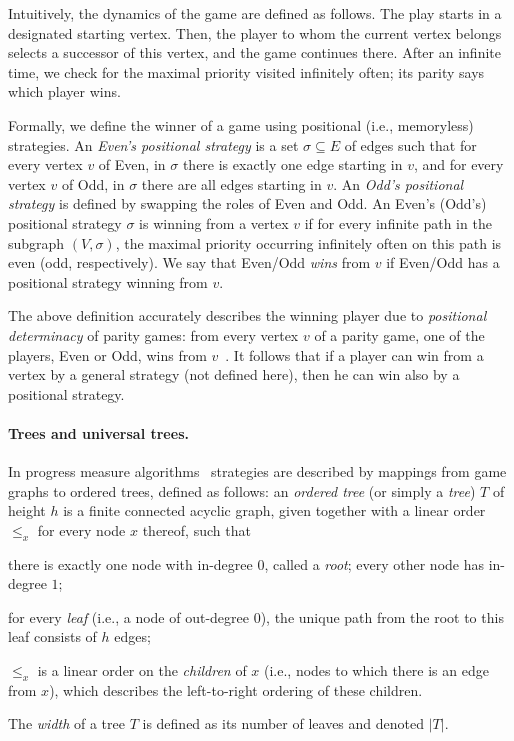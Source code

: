 \documentclass[envcountsect,envcountsame]{llncs}
\begin{document}
	Intuitively, the dynamics of the game are defined as follows.
	The play starts in a designated starting vertex.
	Then, the player to whom the current vertex belongs selects a successor of this vertex, and the game continues there.
	After an infinite time, we check for the maximal priority visited infinitely often; its parity says which player wins.

	Formally, we define the winner of a game using positional (i.e., memoryless) strategies.
	An \emph{Even's positional strategy} is a set $\sigma\subseteq E$ of edges such that
	for every vertex $v$ of Even, in $\sigma$ there is exactly one edge starting in $v$,
	and for every vertex $v$ of Odd, in $\sigma$ there are all edges starting in $v$.
	An \emph{Odd's positional strategy} is defined by swapping the roles of Even and Odd.
	An Even's (Odd's) positional strategy $\sigma$ is winning from a vertex $v$ if for every infinite path in the subgraph $(V,\sigma)$,
	the maximal priority occurring infinitely often on this path is even (odd, respectively).
	We say that Even/Odd \emph{wins} from $v$ if Even/Odd has a positional strategy winning from $v$.

	The above definition accurately describes the winning player due to \emph{positional determinacy} of parity games:
	from every vertex $v$ of a parity game, one of the players, Even or Odd, wins from $v$~\cite{positional-determinacy}.
	It follows that if a player can win from a vertex by a general strategy (not defined here), then he can win also by a positional strategy.


\paragraph{Trees and universal trees.}

	In progress measure algorithms~\cite{progress-measure,fijalkow,Strahler-number} strategies are described by mappings from game graphs to ordered trees, defined as follows:
	an \emph{ordered tree} (or simply a \emph{tree}) $T$ of height $h$ is a finite connected acyclic graph, given together with a linear order $\leq_x$ for every node $x$ thereof, such that
	\begin{compactitem}
	\item	there is exactly one node with in-degree $0$, called a \emph{root}; every other node has in-degree $1$;
	\item	for every \emph{leaf} (i.e., a node of out-degree $0$), the unique path from the root to this leaf consists of $h$ edges;
	\item	$\leq_x$ is a linear order on the \emph{children} of $x$ (i.e., nodes to which there is an edge from $x$),
		which describes the left-to-right ordering of these children.
	\end{compactitem}
	The \emph{width} of a tree $T$ is defined as its number of leaves and denoted $|T|$.
\end{document}
